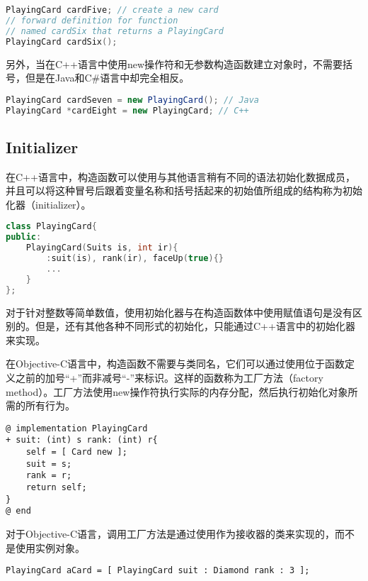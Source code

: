 \begin{lstlisting}[language=C++]
PlayingCard cardFive; // create a new card
// forward definition for function 
// named cardSix that returns a PlayingCard
PlayingCard cardSix(); 
\end{lstlisting}

另外，当在C++语言中使用new操作符和无参数构造函数建立对象时，不需要括号，但是在Java和C\#语言中却完全相反。


\begin{lstlisting}[language=Java]
PlayingCard cardSeven = new PlayingCard(); // Java
PlayingCard *cardEight = new PlayingCard; // C++
\end{lstlisting}


\subsection{Initializer}



在C++语言中，构造函数可以使用与其他语言稍有不同的语法初始化数据成员，并且可以将这种冒号后跟着变量名称和括号括起来的初始值所组成的结构称为初始化器（initializer）。


\begin{lstlisting}[language=C++]
class PlayingCard{
public:
	PlayingCard(Suits is, int ir){
		:suit(is), rank(ir), faceUp(true){}
		...
	}
};
\end{lstlisting}

对于针对整数等简单数值，使用初始化器与在构造函数体中使用赋值语句是没有区别的。但是，还有其他各种不同形式的初始化，只能通过C++语言中的初始化器来实现。

在Objective-C语言中，构造函数不需要与类同名，它们可以通过使用位于函数定义之前的加号“+”而非减号“-”来标识。这样的函数称为工厂方法（factory method）。工厂方法使用new操作符执行实际的内存分配，然后执行初始化对象所需的所有行为。

\begin{lstlisting}[language={[Objective]C}]
@ implementation PlayingCard
+ suit: (int) s rank: (int) r{
	self = [ Card new ];
	suit = s;
	rank = r;
	return self;
} 
@ end
\end{lstlisting}

对于Objective-C语言，调用工厂方法是通过使用作为接收器的类来实现的，而不是使用实例对象。

\begin{lstlisting}[language={[Objective]C}]
PlayingCard aCard = [ PlayingCard suit : Diamond rank : 3 ];
\end{lstlisting}

